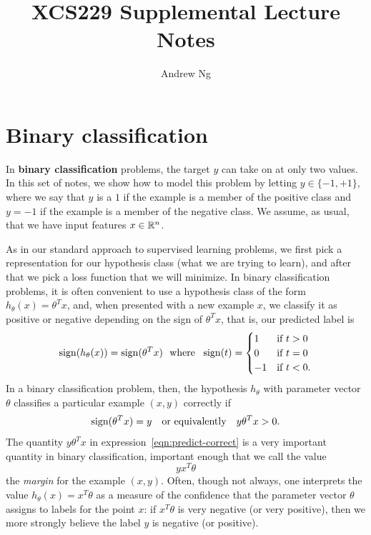 \documentclass{article}
\begin{document}
\title{XCS229 Supplemental Lecture Notes}
\author{Andrew Ng}
\date{}
\maketitle

\section{Binary classification}

In \textbf{binary classification} problems, the target $y$ can take on at
only two values. In this set of notes, we show how to model this problem by
letting $y \in \{-1, +1\}$, where we say that $y$ is a $1$ if the example is
a member of the positive class and $y = -1$ if the example is a member of
the negative class. We assume, as usual, that we have input features
$x \in \mathbb{R}^n$.

As in our standard approach to supervised learning problems, we first pick a
representation for our hypothesis class (what we are trying to learn), and
after that we pick a loss function that we will minimize.  In
binary classification problems, it is often convenient to use a hypothesis
class of the form $h_\theta(x) = \theta^T x$, and, when presented
with a new example $x$, we classify it as positive or negative
depending on the sign of $\theta^T x$, that is, our predicted
label is
\begin{equation*}
  \mathop{\rm sign}(h_\theta(x)) = \mathop{\rm sign}(\theta^T x)
  ~~ \mbox{where} ~~
  \mathop{\rm sign}(t) =
  \begin{cases} 1 & \mbox{if}~ t > 0 \\
    0 & \mbox{if~} t = 0 \\
    -1 & \mbox{if~} t < 0.
  \end{cases}
\end{equation*}
In a binary classification problem, then, the hypothesis $h_\theta$
with parameter vector $\theta$ classifies a particular example
$(x, y)$ correctly if
\begin{equation}
  \label{eqn:predict-correct}
  \mathop{\rm sign}(\theta^T x) = y
  ~~~ \mbox{or equivalently} ~~~
  y \theta^T x > 0.
\end{equation}
The quantity $y \theta^T x$ in expression~\eqref{eqn:predict-correct} is a
very important quantity in binary classification, important enough that we
call the value
\begin{equation*}
  y x^T \theta
\end{equation*}
the \emph{margin} for the example $(x, y)$. Often, though not always, one
interprets the value $h_\theta(x) = x^T \theta$ as a measure of the
confidence that the parameter vector $\theta$ assigns to labels for the
point $x$: if $x^T \theta$ is very negative (or very positive), then we more
strongly believe the label $y$ is negative (or positive).
\end{document}
